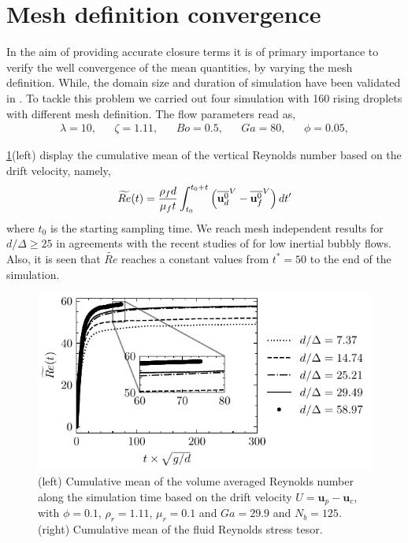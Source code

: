 \section{Mesh definition convergence}
\label{ap:convergence}


In the aim of providing accurate closure terms it is of primary importance to verify the well convergence of the mean quantities, by varying the mesh definition. 
While, the domain size and duration of simulation have been validated in \citet{fintzi2024buoyancy}.
To tackle this problem we carried out four simulation with 160 rising droplets with different mesh definition. 
The flow parameters read as,  
\begin{align*}
    \lambda = 10,
    && \zeta = 1.11,
    && Bo = 0.5,
    && Ga = 80,
    && \phi = 0.05,
\end{align*}

\ref{fig:Re_and_Tc}(left) display the cumulative mean of the vertical Reynolds number based on the drift velocity, namely,
\begin{equation}
    \widetilde{Re}(t)
    = \frac{\rho_f d}{\mu_f t}\int_{t_0}^{t_0+t} \left(\overline{\textbf{u}^0_d}^V -  \overline{\textbf{u}_f^0}^V\right)dt'
\end{equation}
where $t_0$ is the starting sampling time. 
We reach mesh independent results for $d/\Delta \geq 25$ in agreements with the recent studies of \citet{hidman2023assessing} \citet{zhang2021direct} for low inertial bubbly flows.
Also, it is seen that $\widetilde{Re}$ reaches a constant values from $t^* = 50$ to the end of the simulation. 
\begin{figure}[h!]
    \centering
    \includegraphics[height = 0.35\textwidth]{image/HOMOGENEOUS_final/CA/Re.pdf}
    \caption{(left) Cumulative mean of the volume averaged Reynolds number along the simulation time based on the drift velocity $U = \textbf{u}_p - \textbf{u}_c$, with $\phi = 0.1$, $\rho_r = 1.11$, $ \mu_r =0.1$ and $Ga = 29.9$ and $N_b = 125$.
    (right) Cumulative mean of the fluid Reynolds stress tesor. }
    \label{fig:Re_and_Tc}
\end{figure}

